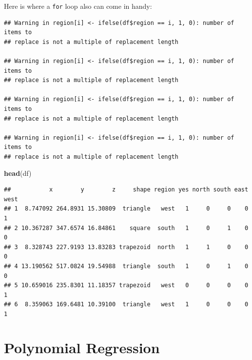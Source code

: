 \documentclass[]{book}
\newenvironment{Shaded}{\begin{snugshade}}{\end{snugshade}}
\newcommand{\KeywordTok}[1]{\textcolor[rgb]{0.13,0.29,0.53}{\textbf{#1}}}
\newcommand{\DecValTok}[1]{\textcolor[rgb]{0.00,0.00,0.81}{#1}}
\newcommand{\ControlFlowTok}[1]{\textcolor[rgb]{0.13,0.29,0.53}{\textbf{#1}}}
\newcommand{\OperatorTok}[1]{\textcolor[rgb]{0.81,0.36,0.00}{\textbf{#1}}}
\newcommand{\NormalTok}[1]{#1}
\theoremstyle{definition}
\theoremstyle{definition}
\theoremstyle{definition}
\theoremstyle{remark}
\begin{document}
Here is where a \texttt{for} loop also can come in handy:

\begin{Shaded}
\end{Shaded}

\begin{verbatim}
## Warning in region[i] <- ifelse(df$region == i, 1, 0): number of items to
## replace is not a multiple of replacement length

## Warning in region[i] <- ifelse(df$region == i, 1, 0): number of items to
## replace is not a multiple of replacement length

## Warning in region[i] <- ifelse(df$region == i, 1, 0): number of items to
## replace is not a multiple of replacement length

## Warning in region[i] <- ifelse(df$region == i, 1, 0): number of items to
## replace is not a multiple of replacement length
\end{verbatim}

\begin{Shaded}
\begin{Highlighting}[]
\KeywordTok{head}\NormalTok{(df)}
\end{Highlighting}
\end{Shaded}

\begin{verbatim}
##           x        y        z     shape region yes north south east west
## 1  8.747092 264.8931 15.30809  triangle   west   1     0     0    0    1
## 2 10.367287 347.6574 16.84861    square  south   1     0     1    0    0
## 3  8.328743 227.9193 13.83283 trapezoid  north   1     1     0    0    0
## 4 13.190562 517.0824 19.54988  triangle  south   1     0     1    0    0
## 5 10.659016 235.8301 11.18357 trapezoid   west   0     0     0    0    1
## 6  8.359063 169.6481 10.39100  triangle   west   1     0     0    0    1
\end{verbatim}

\section{Polynomial Regression}\label{polynomial-regression}


\end{document}
